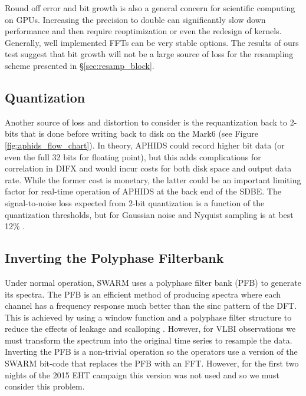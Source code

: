 Round off error and bit growth is also a general concern for scientific computing on GPUs.  
Increasing the precision to double can significantly slow down performance and then 
require reoptimization or even the redesign of kernels.  Generally, well implemented FFTs can 
be very stable options.  The results of ours test suggest that 
bit growth will not be a large source of loss for the resampling scheme presented in \S\ref{sec:resamp_block}.

\subsection{Quantization}
Another source of loss and distortion to consider is the requantization back to 2-bits that is done
before writing back to disk on the Mark6 (see Figure \ref{fig:aphids_flow_chart}).  In theory, APHIDS could 
record higher bit data (or even the full 32 bits for floating point), but this adds complications for 
correlation 
in DIFX and would incur costs for both disk space and output data rate.  While the former cost is monetary, the 
latter could be an important limiting factor for real-time operation of APHIDS at the back end of the SDBE.  
The signal-to-noise loss expected from 2-bit quantization is a function of the quantization 
thresholds, but for Gaussian noise and Nyquist sampling is at best 12\% \citep{cooper70,thompson01}.

\subsection{Inverting the Polyphase Filterbank}
Under normal operation, SWARM uses a polyphase filter bank (PFB) to generate its spectra.  The PFB is an 
efficient method of producing spectra where each channel has a frequency response much better than the 
sinc pattern of the DFT.  This is achieved by using a window function and a polyphase filter structure to reduce 
the effects of leakage and scalloping \citep{lyons11}.  However, for VLBI observations we must transform the 
spectrum into the original time series to resample the data.  Inverting the PFB is a non-trivial operation so 
the operators use a version of the SWARM bit-code that replaces the PFB with an FFT.  However, for the first 
two nights of the 2015 EHT campaign this version was not used and so we must consider this problem.

